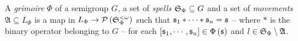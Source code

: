 \documentclass[12pt,b5paper]{article}
\begin{document}
A \textit{grimoire} \(\Phi\) of a semigroup \(G\), a set of \textit{spells} \(\mathfrak{S}_{\Phi}\subseteq G\) and a set of \textit{movements} \(\mathfrak{A}\subseteq L_{\Phi}\) is a map in \(L_{\Phi} \to \mathcal{P}\left(\mathfrak{S}_{\Phi}^{<\omega}\right)\) such that \(\mathfrak{s}_1*\cdots*\mathfrak{s}_n=\mathfrak{s}\) -- where \(*\) is the binary operator belonging to \(G\) -- for each \(\left[ \mathfrak{s}_1,\cdots,\mathfrak{s}_n \right]\in\Phi\left(\mathfrak{s}\right)\) and \(l\in \mathfrak{S}_{\Phi}\setminus\mathfrak{A}\).
\end{document}
